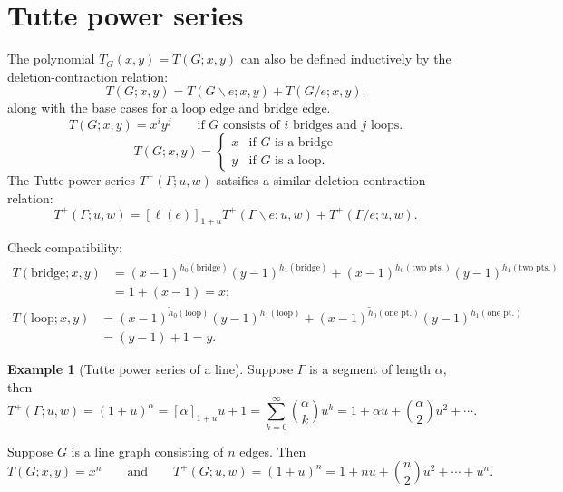 \documentclass{amsart}
\theoremstyle{definition}
\newtheorem{eg}[thm]{Example}
\begin{document}
\section{Tutte power series}
The polynomial $T_G(x,y) = T(G; x,y)$ can also be defined inductively by the 
deletion-contraction relation:
\begin{equation*}
T(G;x,y) = T(G \backslash e; x,y) + T(G / e; x,y).
\end{equation*}
along with the base cases for a loop edge and bridge edge.
\begin{equation*}
T(G; x,y) = x^i y^j \qquad\text{if $G$ consists of $i$ bridges and $j$ loops.}
\end{equation*}
\begin{equation*}
T(G;x,y) = \begin{cases}
x & \text{if $G$ is a bridge} \\
y & \text{if $G$ is a loop}.
\end{cases}
\end{equation*}
The Tutte power series $T^+(\Gamma; u,w)$ satsifies a similar deletion-contraction relation:
\begin{equation}
T^+(\Gamma; u,w) = [\ell(e)]_{1+u} T^+(\Gamma \backslash e; u,w) + T^+(\Gamma / e; u,w) .
\end{equation}

Check compatibility:
\begin{align*}
T(\text{bridge}; x,y) 
&= (x-1)^{\tilde h_0(\text{bridge}) }(y-1)^{h_1(\text{bridge} )} 
+ (x-1)^{\tilde h_0(\text{two pts.}) }(y-1)^{h_1(\text{two pts.})}  \\
&= 1 + (x-1) = x ;
\end{align*}
\begin{align*}
T(\text{loop}; x,y) 
&= (x-1)^{\tilde h_0(\text{loop}) }(y-1)^{h_1(\text{loop} )} 
+ (x-1)^{\tilde h_0(\text{one pt.}) }(y-1)^{h_1(\text{one pt.})} \\
&= (y-1) + 1 = y .
\end{align*}

\begin{eg}[Tutte power series of a line]
Suppose $\Gamma$ is a segment of length $\alpha$,
then
$$
T^+(\Gamma;u,w) = (1+u)^\alpha
= [\alpha]_{1+u} u + 1 = \sum_{k=0}^\infty \binom{\alpha}{k} u^k
= 1 + \alpha u + \binom{\alpha}{2}u^2 + \cdots .
$$

Suppose $G$ is a line graph consisting of $n$ edges.
Then
$$
T(G;x,y) = x^n 
\qquad\text{and}\qquad 
T^+(G;u,w) = (1+u)^n = 1 + nu + \binom{n}{2}u^2 + \cdots + u^n.
$$
\end{eg}
\end{document}
